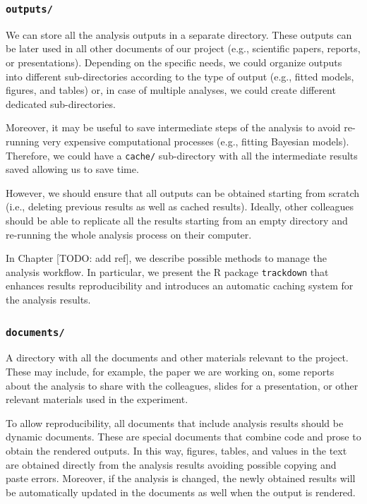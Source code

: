 \documentclass[
  11pt,
]{book}
\begin{document}
\hypertarget{outputs}{%
\subsubsection{\texorpdfstring{\texttt{outputs/}}{outputs/}}\label{outputs}}

We can store all the analysis outputs in a separate directory. These outputs can be later used in all other documents of our project (e.g., scientific papers, reports, or presentations). Depending on the specific needs, we could organize outputs into different sub-directories according to the type of output (e.g., fitted models, figures, and tables) or, in case of multiple analyses, we could create different dedicated sub-directories.

Moreover, it may be useful to save intermediate steps of the analysis to avoid re-running very expensive computational processes (e.g., fitting Bayesian models). Therefore, we could have a \texttt{cache/} sub-directory with all the intermediate results saved allowing us to save time.

However, we should ensure that all outputs can be obtained starting from scratch (i.e., deleting previous results as well as cached results). Ideally, other colleagues should be able to replicate all the results starting from an empty directory and re-running the whole analysis process on their computer.

In Chapter {[}TODO: add ref{]}, we describe possible methods to manage the analysis workflow. In particular, we present the R package \texttt{trackdown} that enhances results reproducibility and introduces an automatic caching system for the analysis results.

\hypertarget{documents}{%
\subsubsection{\texorpdfstring{\texttt{documents/}}{documents/}}\label{documents}}

A directory with all the documents and other materials relevant to the project. These may include, for example, the paper we are working on, some reports about the analysis to share with the colleagues, slides for a presentation, or other relevant materials used in the experiment.

To allow reproducibility, all documents that include analysis results should be dynamic documents. These are special documents that combine code and prose to obtain the rendered outputs. In this way, figures, tables, and values in the text are obtained directly from the analysis results avoiding possible copying and paste errors. Moreover, if the analysis is changed, the newly obtained results will be automatically updated in the documents as well when the output is rendered.
\end{document}
